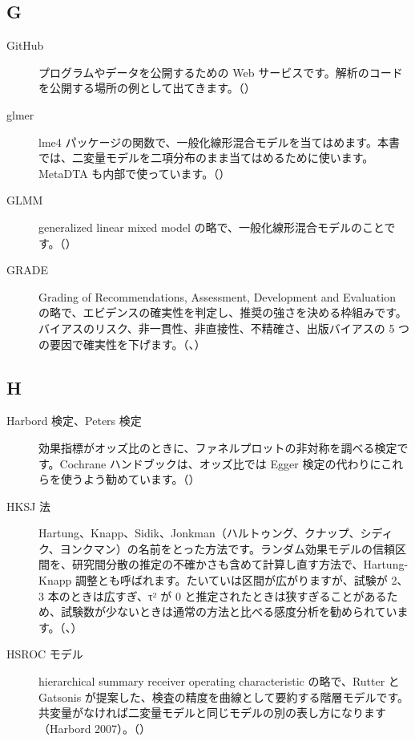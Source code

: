 \subsection*{G}
\begin{description}
\item[GitHub] プログラムやデータを公開するための Web サービスです。解析のコードを公開する場所の例として出てきます。（）
\item[glmer] lme4 パッケージの関数で、一般化線形混合モデルを当てはめます。本書では、二変量モデルを二項分布のまま当てはめるために使います。MetaDTA も内部で使っています。（）
\item[GLMM] generalized linear mixed model の略で、一般化線形混合モデルのことです。（）
\item[GRADE] Grading of Recommendations, Assessment, Development and Evaluation の略で、エビデンスの確実性を判定し、推奨の強さを決める枠組みです。バイアスのリスク、非一貫性、非直接性、不精確さ、出版バイアスの 5 つの要因で確実性を下げます。（、）
\end{description}

\subsection*{H}
\begin{description}
\item[Harbord 検定、Peters 検定] 効果指標がオッズ比のときに、ファネルプロットの非対称を調べる検定です。Cochrane ハンドブックは、オッズ比では Egger 検定の代わりにこれらを使うよう勧めています。（）
\item[HKSJ 法] Hartung、Knapp、Sidik、Jonkman（ハルトゥング、クナップ、シディク、ヨンクマン）の名前をとった方法です。ランダム効果モデルの信頼区間を、研究間分散の推定の不確かさも含めて計算し直す方法で、Hartung-Knapp 調整とも呼ばれます。たいていは区間が広がりますが、試験が 2、3 本のときは広すぎ、τ² が 0 と推定されたときは狭すぎることがあるため、試験数が少ないときは通常の方法と比べる感度分析を勧められています。（、）
\item[HSROC モデル] hierarchical summary receiver operating characteristic の略で、Rutter と Gatsonis が提案した、検査の精度を曲線として要約する階層モデルです。共変量がなければ二変量モデルと同じモデルの別の表し方になります（Harbord 2007）。（）
\end{description}


